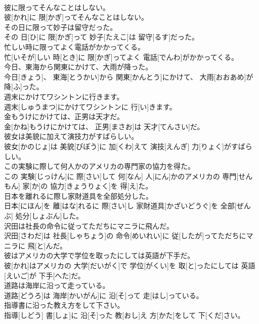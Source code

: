 \documentclass[8pt]{extreport}
\begin{document}
\begin{CJK}{UTF8}{min}
\\	彼に限ってそんなことはしない。	
\\	彼[かれ]に 限[かぎ]ってそんなことはしない。
\\	その日に限って妙子は留守だった。	
\\	その 日[ひ]に 限[かぎ]って 妙子[たえこ]は 留守[るす]だった。
\\	忙しい時に限ってよく電話がかかってくる。	
\\	忙[いそが]しい 時[とき]に 限[かぎ]ってよく 電話[でんわ]がかかってくる。
\\	今日、東海から関東にかけて、大雨が降った。	
\\	今日[きょう]、 東海[とうかい]から 関東[かんとう]にかけて、 大雨[おおあめ]が 降[ふ]った。
\\	週末にかけてワシントンに行きます。	
\\	週末[しゅうまつ]にかけてワシントンに 行[い]きます。
\\	金もうけにかけては、正男は天才だ。	
\\	金[かね]もうけにかけては、 正男[まさお]は 天才[てんさい]だ。
\\	彼女は美貌に加えて演技力がすばらしい。	
\\	彼女[かのじょ]は 美貌[びぼう]に 加[くわ]えて 演技[えんぎ] 力[りょく]がすばらしい。
\\	この実験に際して何人かのアメリカの専門家の協力を得た。	
\\	この 実験[じっけん]に 際[さい]して 何[なん] 人[にん]かのアメリカの 専門[せんもん] 家[か]の 協力[きょうりょく]を 得[え]た。
\\	日本を離れるに際し家財道具を全部処分した。	
\\	日本[にほん]を 離[はな]れるに 際[さい]し 家財道具[かざいどうぐ]を 全部[ぜんぶ] 処分[しょぶん]した。
\\	沢田は社長の命令に従ってただちにマニラに飛んだ。	
\\	沢田[さわだ]は 社長[しゃちょう]の 命令[めいれい]に 従[したが]ってただちにマニラに 飛[と]んだ。
\\	彼はアメリカの大学で学位を取ったにしては英語が下手だ。	
\\	彼[かれ]はアメリカの 大学[だいがく]で 学位[がくい]を 取[と]ったにしては 英語[えいご]が 下手[へた]だ。
\\	道路は海岸に沿って走っている。	
\\	道路[どうろ]は 海岸[かいがん]に 沿[そ]って 走[はし]っている。
\\	指導書に沿った教え方をして下さい。	
\\	指導[しどう] 書[しょ]に 沿[そ]った 教[おし]え 方[かた]をして 下[くだ]さい。

\end{CJK}
\end{document}
